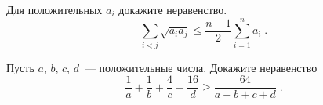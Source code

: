 \begin{problems}
\item
Для положительных $a_{i}$ докажите неравенство.
\[
    \sum_{i<j}
        \sqrt{a_{i} a_{j}}
\leq
    \frac{n - 1}{2}
    \sum_{i=1}^{n}
        a_{i}
\; . \]

\item
Пусть $a$, $b$, $c$, $d$~--- положительные числа.
Докажите неравенство
\[
    \frac{1}{a} + \frac{1}{b} + \frac{4}{c} + \frac{16}{d}
\geq
    \frac{64}{a + b + c + d}
\; . \]

\end{problems}

